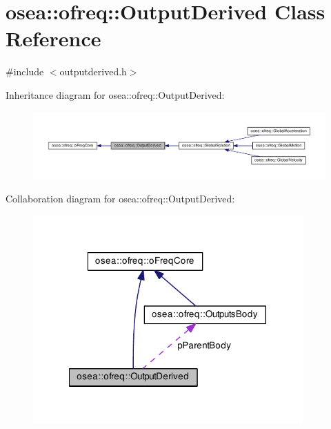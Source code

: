 \hypertarget{classosea_1_1ofreq_1_1_output_derived}{\section{osea\-:\-:ofreq\-:\-:Output\-Derived Class Reference}
\label{classosea_1_1ofreq_1_1_output_derived}
}


{\ttfamily \#include $<$outputderived.\-h$>$}



Inheritance diagram for osea\-:\-:ofreq\-:\-:Output\-Derived\-:\nopagebreak
\begin{figure}[H]
\begin{center}
\leavevmode
\includegraphics[width=350pt]{classosea_1_1ofreq_1_1_output_derived__inherit__graph}
\end{center}
\end{figure}


Collaboration diagram for osea\-:\-:ofreq\-:\-:Output\-Derived\-:
\nopagebreak
\begin{figure}[H]
\begin{center}
\leavevmode
\includegraphics[width=293pt]{classosea_1_1ofreq_1_1_output_derived__coll__graph}
\end{center}
\end{figure}

